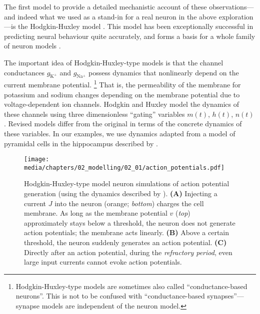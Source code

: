 \vspace*{-0.25em}
The first model to provide a detailed mechanistic account of these observations---and indeed what we used as a stand-in for a real neuron in the above exploration---is the Hodgkin-Huxley model \citep{hodgkin1952quantitative}.
This model has been exceptionally successful in predicting neural behaviour quite accurately, and forms a basis for a whole family of neuron models \citep{meunier2002playing,mccormick2007hodgkin}.

The important idea of Hodgkin-Huxley-type models is that the channel conductances $g_\mathrm{K^+}$ and $g_\mathrm{Na^+}$ possess dynamics that nonlinearly depend on the current membrane potential.%
\footnote{Hodgkin-Huxley-type models are sometimes also called \enquote{conductance-based neurons}. This is not to be confused with \enquote{conductance-based synapses}---synapse models are independent of the neuron model.}
That is, the permeability of the membrane for potassium and sodium changes depending on the membrane potential due to voltage-dependent ion channels.
Hodgkin and Huxley model the dynamics of these channels using three dimensionless \enquote{gating} variables $m(t)$, $h(t)$, $n(t)$.
Revised models differ from the original in terms of the concrete dynamics of these variables.
In our examples, we use dynamics adapted from a model of pyramidal cells in the hippocampus described by \citet[Chapter~4, pp.~92-94]{traub1991neuronal}.

\begin{figure}[p]
	\texttt{[image: media/chapters/02\_modelling/02\_01/action\_potentials.pdf]}
	{\label{fig:action_potentials_subthreshold}}
	{\label{fig:action_potentials_superthreshold}}
	{\label{fig:action_potentials_refractory}}
	\caption[Hodgkin-Huxley-type model neuron simulations of action potential generation]{Hodgkin-Huxley-type model neuron simulations of action potential generation (using the dynamics described by \cite{traub1991neuronal}).
	\textbf{(A)} Injecting a current $J$ into the neuron (orange; \emph{bottom}) charges the cell membrane. As long as the membrane potential $v$ (\emph{top}) approximately stays below a threshold, the neuron does not generate action potentials; the membrane acts linearly. \textbf{(B)} Above a certain threshold, the neuron suddenly generates an action potential. \textbf{(C)} Directly after an action potential, during the \emph{refractory period}, even large input currents cannot evoke action potentials.}
\end{figure}

